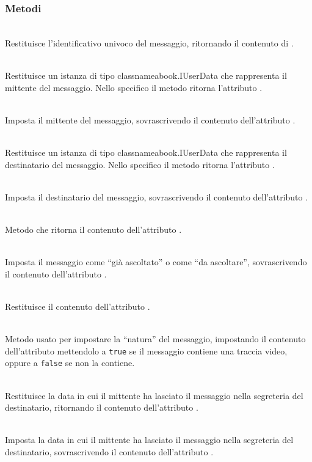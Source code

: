 \subsubsection*{Metodi}
\begin{description}
	\item{}\\
	Restituisce l'identificativo univoco del messaggio, ritornando il contenuto di .
	\item{}\\
	Restituisce un istanza di tipo classname{abook.IUserData} che rappresenta il mittente del messaggio. Nello specifico il metodo ritorna l'attributo .
	\item{}\\
	Imposta il mittente del messaggio, sovrascrivendo il contenuto dell'attributo .
	\item{}\\
	Restituisce un istanza di tipo classname{abook.IUserData} che rappresenta il destinatario del messaggio. Nello specifico il metodo ritorna l'attributo .
	\item{}\\
	Imposta il destinatario del messaggio, sovrascrivendo il contenuto dell'attributo .
	\item{}\\
	Metodo che ritorna il contenuto dell'attributo .
	\item{}\\
	Imposta il messaggio come ``già ascoltato'' o come ``da ascoltare'', sovrascrivendo il contenuto dell'attributo .
	\item{}\\
	Restituisce il contenuto dell'attributo .
	\item{}\\	
	Metodo usato per impostare la ``natura'' del messaggio, impostando il contenuto dell'attributo  mettendolo a \texttt{true} se il messaggio contiene una traccia video, oppure a \texttt{false} se non la contiene.
	\item{}\\
	Restituisce la data in cui il mittente ha lasciato il messaggio nella segreteria del destinatario, ritornando il contenuto dell'attributo .
	\item{}\\
	Imposta la data in cui il mittente ha lasciato il messaggio nella segreteria del destinatario, sovrascrivendo il contenuto dell'attributo .

\end{description}

